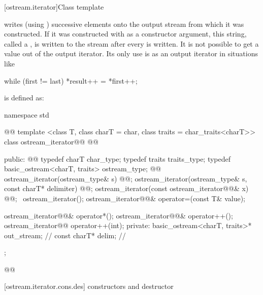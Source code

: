 %
\begin{itemdescr}
\pnum
\returns
{}
\end{itemdescr}

[ostream.iterator]{Class template }

\pnum
{}%
writes (using
)
successive elements onto the output stream from which it was constructed.
If it was constructed with
as a constructor argument, this string, called a
,
is written to the stream after every
is written.
It is not possible to get a value out of the output iterator.
Its only use is as an output iterator in situations like

\begin{codeblock}
while (first != last)
  *result++ = *first++;
\end{codeblock}

\pnum
{}
is defined as:

\begin{codeblock}
namespace std { @@
  template <class T, class charT = char, class traits = char_traits<charT>>
  class ostream_iterator@\removed{:}@
    @@ {
  public:
    @@
    typedef charT char_type;
    typedef traits traits_type;
    typedef basic_ostream<charT, traits> ostream_type;
    @@
    ostream_iterator(ostream_type& s) @@;
    ostream_iterator(ostream_type& s, const charT* delimiter) @@;
    ostream_iterator(const ostream_iterator@@& x) @@;
   ~ostream_iterator();
    ostream_iterator@@& operator=(const T& value);

    ostream_iterator@@& operator*();
    ostream_iterator@@& operator++();
    ostream_iterator@@ operator++(int);
  private:
    basic_ostream<charT, traits>* out_stream;  // \expos
    const charT* delim;                        // \expos
  };
}@\added{\}\}}\newtxt{\}}@
\end{codeblock}

[ostream.iterator.cons.des]{ constructors and destructor}

